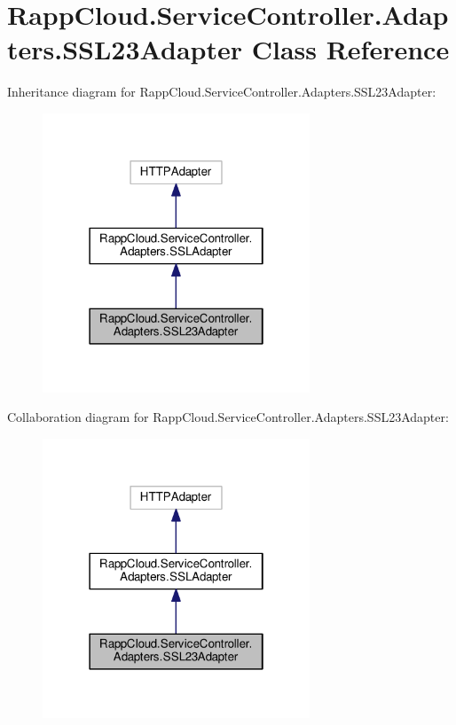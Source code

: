 \hypertarget{classRappCloud_1_1ServiceController_1_1Adapters_1_1SSL23Adapter}{\section{Rapp\-Cloud.\-Service\-Controller.\-Adapters.\-S\-S\-L23\-Adapter Class Reference}
\label{classRappCloud_1_1ServiceController_1_1Adapters_1_1SSL23Adapter}
}


Inheritance diagram for Rapp\-Cloud.\-Service\-Controller.\-Adapters.\-S\-S\-L23\-Adapter\-:
\nopagebreak
\begin{figure}[H]
\begin{center}
\leavevmode
\includegraphics[width=226pt]{classRappCloud_1_1ServiceController_1_1Adapters_1_1SSL23Adapter__inherit__graph}
\end{center}
\end{figure}


Collaboration diagram for Rapp\-Cloud.\-Service\-Controller.\-Adapters.\-S\-S\-L23\-Adapter\-:
\nopagebreak
\begin{figure}[H]
\begin{center}
\leavevmode
\includegraphics[width=226pt]{classRappCloud_1_1ServiceController_1_1Adapters_1_1SSL23Adapter__coll__graph}
\end{center}
\end{figure}
